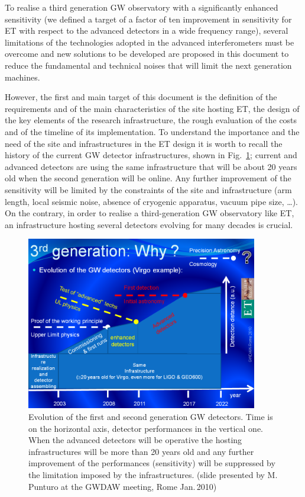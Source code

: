 To realise a third generation GW observatory with a significantly enhanced sensitivity (we defined a target of a factor of ten improvement in sensitivity for ET with respect to the advanced detectors in a wide frequency range), several limitations of the technologies adopted in the advanced interferometers must be overcome and new solutions to be developed are proposed in this document to reduce the fundamental and technical noises that will limit the next generation machines. \par 
However, the first and main target of this document is the definition of the requirements and of the main characteristics of the site hosting ET, the design of the key elements of the research infrastructure, the rough evaluation of the costs and of the timeline of its implementation.  To understand the importance and the need of the site and infrastructures in the ET design it is worth to recall the history of the current GW detector infrastructures, shown in Fig.~\ref{Fig:InfraEvolution}; current and advanced detectors are using the same infrastructure that will be about 20 years old when the second generation will be online. Any further improvement of the sensitivity will be limited by the constraints of the site and infrastructure (arm length, local seismic noise, absence of cryogenic apparatus, vacuum pipe size, \dots). On the contrary, in order to realise a third-generation GW observatory like ET, an infrastructure  hosting several detectors evolving for many decades is crucial.
%

\begin{figure}
\centering
\includegraphics[width=0.9\textwidth]{Sec_Introduction/GWDAW-2010PunturoInfrastructureAdv.png}
\caption{Evolution of the first and second generation GW detectors. Time is on the horizontal axis, detector performances in the vertical one. When the advanced detectors will be operative the hosting infrastructures will be more than 20 years old and any further improvement of the performances (sensitivity) will be suppressed by the limitation imposed by the infrastructures. (slide presented by M.\,Punturo at the GWDAW meeting, Rome Jan.\,2010) }
\label{Fig:InfraEvolution}
\end{figure}
%
%
\FloatBarrier

